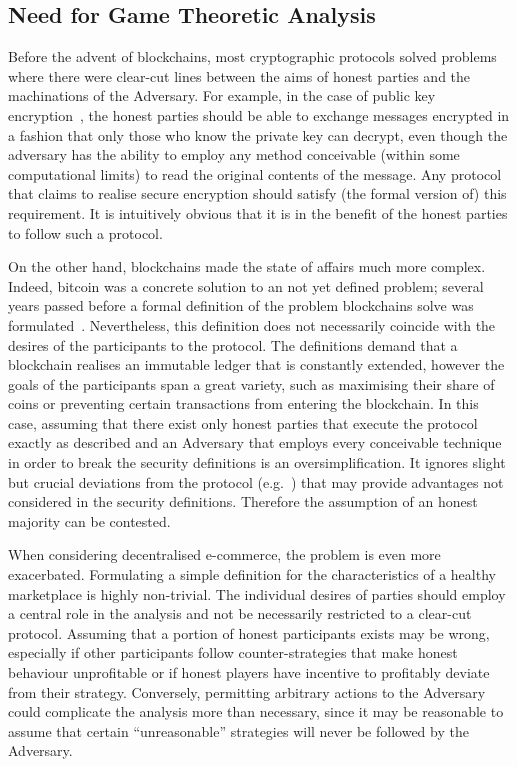 \subsection{Need for Game Theoretic Analysis}
  Before the advent of blockchains, most cryptographic protocols solved problems where
  there were clear-cut lines between the aims of honest parties and the machinations of
  the Adversary. For example, in the case of public key encryption~\cite{dh}, the honest
  parties should be able to exchange messages encrypted in a fashion that only those who
  know the private key can decrypt, even though the adversary has the ability to employ
  any method conceivable (within some computational limits) to read the original contents
  of the message. Any protocol that claims to realise secure encryption should satisfy
  (the formal version of) this requirement. It is intuitively obvious that it is in the
  benefit of the honest parties to follow such a protocol.

  On the other hand, blockchains made the state of affairs much more complex. Indeed,
  bitcoin was a concrete solution to an not yet defined problem; several years passed
  before a formal definition of the problem blockchains solve was
  formulated~\cite{backbone}. Nevertheless, this definition does not necessarily coincide
  with the desires of the participants to the protocol. The definitions demand that a
  blockchain realises an immutable ledger that is constantly extended, however the goals
  of the participants span a great variety, such as maximising their share of coins or
  preventing certain transactions from entering the blockchain. In this case, assuming
  that there exist only honest parties that execute the protocol exactly as described and
  an Adversary that employs every conceivable technique in order to break the security
  definitions is an oversimplification. It ignores slight but crucial deviations from the
  protocol (e.g.~\cite{selfishmine}) that may provide advantages not considered in the
  security definitions. Therefore the assumption of an honest majority can be contested.

  When considering decentralised e-commerce, the problem is even more exacerbated.
  Formulating a simple definition for the characteristics of a healthy marketplace is
  highly non-trivial. The individual desires of parties should employ a central role in
  the analysis and not be necessarily restricted to a clear-cut protocol. Assuming that a
  portion of honest participants exists may be wrong, especially if other participants
  follow counter-strategies that make honest behaviour unprofitable or if honest players
  have incentive to profitably deviate from their strategy. Conversely, permitting
  arbitrary actions to the Adversary could complicate the analysis more than necessary,
  since it may be reasonable to assume that certain ``unreasonable'' strategies will never
  be followed by the Adversary.
